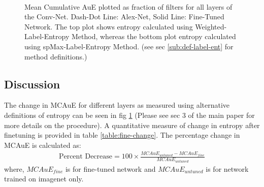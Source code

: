 \documentclass[runningheads]{llncs}
\begin{document}
\begin{figure}
\centering
{} \\
\caption{Mean Cumulative AuE plotted as fraction of filters for all layers of the Conv-Net. Dash-Dot Line: Alex-Net, Solid Line: Fine-Tuned Network. The top plot shows entropy calculated using Weighted-Label-Entropy Method, whereas the bottom plot entropy calculated using spMax-Label-Entropy Method. (see sec \ref{sub:def-label-ent} for method definitions.)}
\label{fig:fine-entropy}
\end{figure}

\subsection{Discussion}
The change in MCAuE for different layers as measured using alternative definitions of entropy can be seen in fig \ref{fig:fine-entropy} (Please see sec 3 of the main paper for more details on the procedure). A quantitative measure of change in entropy after finetuning is provided in table \ref{table:fine-change}. The percentage change in MCAuE is calculated as:
\begin{eqnarray}
\text{Percent Decrease} = 100 \times \frac{MCAuE_{untuned} - MCAuE_{fine}}{MCAuE_{untuned}}
\end{eqnarray}
where, $MCAuE_{fine}$ is for fine-tuned network and $MCAuE_{untuned}$ is for network trained on imagenet only.
\end{document}
